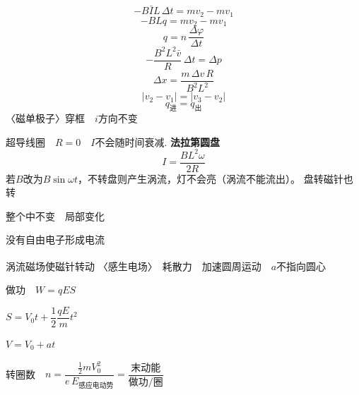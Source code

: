 \[ -B\bar{I}L\,\Delta t=mv_2-mv_1 \]
\[ -BLq=mv_2-mv_1 \]
\[ q=n\,\frac{\Delta\varphi}{\Delta t} \]%
\[ -\frac{B^2L^2\bar{v}}{R}\,\Delta t=\Delta p \]
\[ \Delta x=\frac{m\,\Delta v\,R}{B^2L^2} \]
\[ |v_2-v_1|=|v_3-v_2| \]
\[ q_{\text{进}}=q_{\text{出}} \]
\noindent 〈磁单极子〉穿框　$i$方向不变

\noindent 超导线圈　$R=0$　$I$不会随时间衰减.
\noindent \textbf{法拉第圆盘}
\[ I=\dfrac{BL^2\omega}{2R} \]
\noindent 若$B$改为$B\sin\omega t$，不转盘则产生涡流，灯不会亮（涡流不能流出）。
\noindent 盘转磁针也转

\noindent 整个中不变　局部变化

\noindent 没有自由电子形成电流

\noindent 涡流\textsuperscript{}磁场使磁针转动
\noindent 〈感生电场〉　耗散力　加速圆周运动　$a$不指向圆心

\noindent 做功　$W=qES$

\noindent \hspace*{2em}$S=V_0t+\dfrac{1}{2}\dfrac{qE}{m}t^2$

\noindent \hspace*{2em}$V=V_0+at$

\noindent 转圈数　$n=\dfrac{\frac{1}{2}mV_0^2}{e\,E_{\text{感应电动势}}}=\dfrac{\text{末动能}}{\text{做功/圈}}$%

